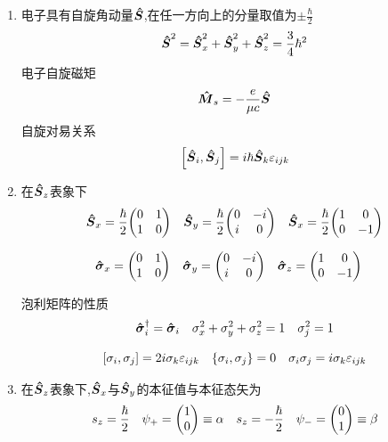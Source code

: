 \documentclass{article}
\begin{document}
        \begin{formal}
        \begin{enumerate}
            \item 电子具有自旋角动量$\vu*{S}$,在任一方向上的分量取值为$\pm \frac{\hbar}{2} $
                  $$ \vu*{S}^{2} = \vu*{S}_{x}^{2} + \vu*{S}_{y}^{2} + \vu*{S}_{z}^{2} = \frac{3}{4} \hbar^{2} $$ 
                  电子自旋磁矩
                  $$ \vu*{M}_{s} = - \frac{e}{\mu c} \vu*{S}$$
                  自旋对易关系
                  $$ \comm{\vu*{S}_{i}}{\vu*{S}_{j}} = i \hbar \vu*{S}_{k} \varepsilon_{ijk} $$

            \item 在$\vu*{S}_{z}$表象下
                  $$ 
                  \vu*{S}_{x} = \frac{\hbar}{2} \mqty(0 & 1 \\ 1 & 0) \quad  
                  \vu*{S}_{y} = \frac{\hbar}{2} \mqty(0 & -i \\ i & 0) \quad 
                  \vu*{S}_{x} = \frac{\hbar}{2} \mqty(1 & 0 \\ 0 & -1)
                  $$

                  $$
                  \vu*{\sigma}_{x} = \mqty(0 & 1 \\ 1 & 0) \quad 
                  \vu*{\sigma}_{y} = \mqty(0 & -i \\ i & 0) \quad 
                  \vu*{\sigma}_{z} = \mqty(1 & 0 \\ 0 & -1) \quad 
                  $$

                  泡利矩阵的性质
                  $$ 
                  \vu*{\sigma}_{i}^{\dagger} = \vu*{\sigma}_{i} \quad 
                  \sigma_{x}^{2} + \sigma_{y}^{2} + \sigma_{z}^{2} = 1 \quad 
                  \sigma_{j}^{2} = 1
                  $$

                  $$
                  \comm{\sigma_{i}}{\sigma_{j}} = 2i \sigma_{k} \varepsilon_{ijk} \quad
                  \qty{\sigma_{i},\sigma_{j}} = 0 \quad 
                  \sigma_{i} \sigma_{j} = i \sigma_{k} \varepsilon_{ijk}
                  $$

            \item 在$\vu*{S}_{z}$表象下,$\vu*{S}_{x}$与$\vu*{S}_{y}$的本征值与本征态矢为
                  $$ 
                  s_{z} = \frac{\hbar}{2} \quad \psi_{+} = \mqty(1 \\ 0) \equiv \alpha  \quad    
                  s_{z} = - \frac{\hbar}{2} \quad \psi_{-} = \mqty(0 \\ 1) \equiv \beta 
                  $$


\end{enumerate}
\end{formal}
\end{document}
